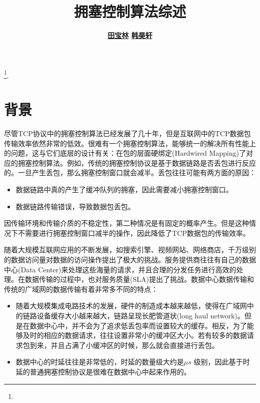 \documentclass[a4paper, 12pt, UTF8]{ctexart}
\begin{document}
\title{\bf 拥塞控制算法综述} \author{
\bf \href{https://github.com/baolintian}{田宝林}\quad 
\bf \href{https://github.com/miracleXH}{韩昊轩}} 
\date{}

\maketitle
\tableofcontents
\footnote{\noindent {} \newline
  \updatetext{\today}}.

\clearpage


\section{背景}
\par 尽管TCP协议中的拥塞控制算法已经发展了几十年，但是互联网中的TCP数据包传输效率依然非常的低效。很难有一个拥塞控制算法，能够统一的解决所有性能上的问题，这与它们底层的设计有关：在包的层面硬绑定(Hardwired Mapping)\cite{DongMZAGGS18}了对应的拥塞控制算法。例如，传统的拥塞控制协议是基于数据链路是否丢包进行反应的。一旦产生丢包，那么拥塞控制窗口就会减半。丢包往往可能有两方面的原因\cite{DBLP:conf/imc/SundaresanADC17}：
\begin{itemize}
	\item 数据链路中真的产生了缓冲队列的拥塞，因此需要减小拥塞控制窗口。
	\item 数据链路传输错误，导致数据包丢包。
\end{itemize}

\par 因传输环境和传输介质的不稳定性，第二种情况是有固定的概率产生。但是这种情况下不需要进行拥塞控制窗口减半的操作，因此降低了TCP数据包的传输效率。

\par 随着大规模互联网应用的不断发展，如搜索引擎、视频网站、网络商店，千万级别的数据访问量对数据的访问操作提出了极大的挑战。服务提供商往往有自己的数据中心(Data Center)来处理这些海量的请求，并且合理的分发任务进行高效的处理。在数据传输的过程中，也对服务质量(SLA)提出了挑战。数据中心数据传输和传统的广域网的数据传输有着非常多不同的特点：
\begin{itemize}
	\item 随着大规模集成电路技术的发展，硬件的制造成本越来越低，使得在广域网中的链路设备缓存大小越来越大，链路呈现长肥管道状(long haul network)\cite{BDP}。但是在数据中心中，并不会为了追求低丢包率而设置较大的缓存。相反，为了能够及时的相应的数据请求，往往设置非常小的缓冲区大小。若有较多的数据请求包到来，并且占满了小缓冲区的时候，那么就会直接进行丢包。
	\item 数据中心的时延往往是非常低的，时延的数量级大约是$\mu s$ 级别，因此基于时延的普通拥塞控制协议是很难在数据中心中起来作用的\cite{DBLP:conf/sigcomm/ZakiPCSG15}。
\end{itemize}
\end{document}
